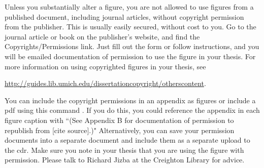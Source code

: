 Unless you substantially alter a figure, you are not allowed to use figures from a published document, including journal articles, without copyright permission from the publisher.  This is usually easily secured, without cost to you.  Go to the journal article or book on the publisher's website, and find the Copyrights/Permissions link.  Just fill out the form or follow instructions, and you will be emailed documentation of permission to use the figure in your thesis.  For more information on using copyrighted figures in your thesis, see 

\href{http://guides.lib.umich.edu/dissertationcopyright/otherscontent}{http://guides.lib.umich.edu/dissertationcopyright/otherscontent}.

You can include the copyright permissions in an appendix as figures or include a pdf using this command \verb!!. If you do this, you could reference the appendix in each figure caption with ``(See Appendix B for documentation of permission to republish from [cite source].)" Alternatively, you can save your permission documents into a separate document and include them as a separate upload to the \gls{cdr}.  Make sure you note in your thesis that you are using the figure with permission.  Please talk to Richard Jizba at the Creighton Library for advice.  


